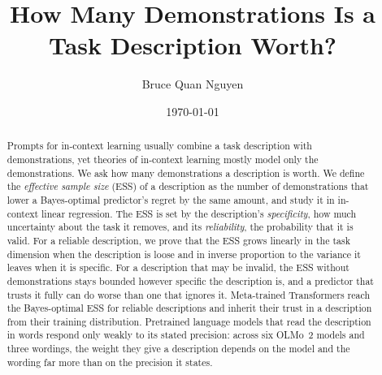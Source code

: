 \documentclass[10pt]{article}
\title{How Many Demonstrations Is a Task Description Worth?}
\author{Bruce Quan Nguyen}
\date{\today}
\begin{document}
\maketitle

\begin{abstract}
Prompts for in-context learning usually combine a task description with demonstrations, yet theories of in-context learning mostly model only the demonstrations. We ask how many demonstrations a description is worth. We define the \emph{effective sample size} (ESS) of a description as the number of demonstrations that lower a Bayes-optimal predictor's regret by the same amount, and study it in in-context linear regression. The ESS is set by the description's \emph{specificity}, how much uncertainty about the task it removes, and its \emph{reliability}, the probability that it is valid. For a reliable description, we prove that the ESS grows linearly in the task dimension when the description is loose and in inverse proportion to the variance it leaves when it is specific. For a description that may be invalid, the ESS without demonstrations stays bounded however specific the description is, and a predictor that trusts it fully can do worse than one that ignores it. Meta-trained Transformers reach the Bayes-optimal ESS for reliable descriptions and inherit their trust in a description from their training distribution. Pretrained language models that read the description in words respond only weakly to its stated precision: across six OLMo~2 models and three wordings, the weight they give a description depends on the model and the wording far more than on the precision it states.
\end{abstract}
\end{document}
